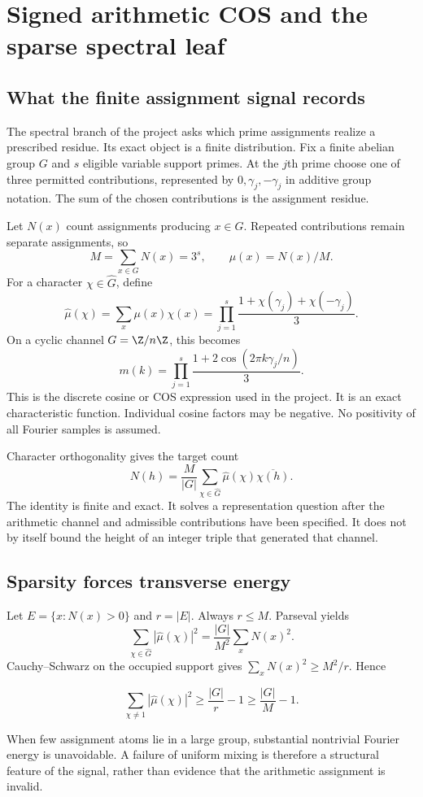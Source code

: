 \section{Signed arithmetic COS and the sparse spectral leaf}\label{sec:sparse}
\subsection{What the finite assignment signal records}
The spectral branch of the project asks which prime assignments realize a prescribed residue. Its exact object is a finite distribution. Fix a finite abelian group $G$ and $s$ eligible variable support primes. At the $j$th prime choose one of three permitted contributions, represented by $0,\gamma_j,-\gamma_j$ in additive group notation. The sum of the chosen contributions is the assignment residue.

Let $N(x)$ count assignments producing $x\in G$. Repeated contributions remain separate assignments, so
\[
 M=\sum_{x\in G}N(x)=3^s,\qquad \mu(x)=N(x)/M.
\]
For a character $\chi\in\widehat G$, define
\[
 \widehat\mu(\chi)=\sum_x\mu(x)\chi(x)
 =\prod_{j=1}^s\frac{1+\chi(\gamma_j)+\chi(-\gamma_j)}3.
\]
On a cyclic channel $G=\Z/n\Z$, this becomes
\[
 m(k)=\prod_{j=1}^s\frac{1+2\cos(2\pi k\gamma_j/n)}3.
\]
This is the discrete cosine or COS expression used in the project. It is an exact characteristic function. Individual cosine factors may be negative. No positivity of all Fourier samples is assumed.

Character orthogonality gives the target count
\[
 N(h)=\frac M{|G|}\sum_{\chi\in\widehat G}\widehat\mu(\chi)\overline{\chi(h)}.
\]
The identity is finite and exact. It solves a representation question after the arithmetic channel and admissible contributions have been specified. It does not by itself bound the height of an integer triple that generated that channel.

\subsection{Sparsity forces transverse energy}
Let $E=\{x:N(x)>0\}$ and $r=|E|$. Always $r\le M$. Parseval yields
\[
 \sum_{\chi\in\widehat G}|\widehat\mu(\chi)|^2
 =\frac{|G|}{M^2}\sum_xN(x)^2.
\]
Cauchy--Schwarz on the occupied support gives $\sum_xN(x)^2\ge M^2/r$. Hence
\begin{proposition}\label{prop:sparse-energy}
\[
 \sum_{\chi\ne1}|\widehat\mu(\chi)|^2
 \ge\frac{|G|}{r}-1\ge\frac{|G|}{M}-1.
\]
\end{proposition}
When few assignment atoms lie in a large group, substantial nontrivial Fourier energy is unavoidable. A failure of uniform mixing is therefore a structural feature of the signal, rather than evidence that the arithmetic assignment is invalid.


